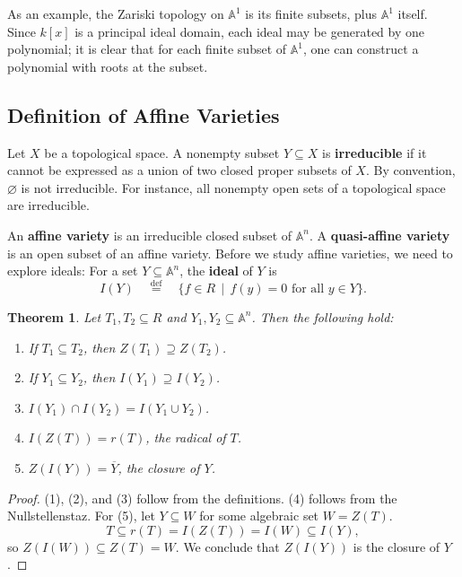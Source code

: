 \documentclass[11pt]{article}
\newtheorem{theorem}{Theorem}
\begin{document}
As an example, the Zariski topology on $\mathbb{A}^{1}$ is its finite subsets, plus $\mathbb{A}^{1}$ itself. Since $k[x]$ is a principal ideal domain, each ideal may be generated by one polynomial; it is clear that for each finite subset of $\mathbb{A}^{1}$, one can construct a polynomial with roots at the subset.


\subsection{Definition of Affine Varieties}

Let $X$ be a topological space. A nonempty subset $Y \subseteq X$ is \textbf{irreducible} if it cannot be expressed as a union of two closed proper subsets of $X$. By convention, $\varnothing$ is not irreducible. For instance, all nonempty open sets of a topological space are irreducible.
 
An \textbf{affine variety} is an irreducible closed subset of $\mathbb{A}^{n}$. A \textbf{quasi-affine variety} is an open subset of an affine variety. Before we study affine varieties, we need to explore ideals: For a set $Y \subseteq \mathbb{A}^{n}$, the \textbf{ideal} of $Y$ is
\[
  I(Y) \quad \stackrel{\text{def}}{=} \quad \{ f \in R \, \mid \, f(y) = 0 \text{ for all } y \in Y \}.
\]
\begin{adjustwidth}{0.5cm}{}
  \begin{theorem}
    Let $T_{1}, T_{2} \subseteq R$ and $Y_{1}, Y_{2} \subseteq \mathbb{A}^{n}$. Then the following hold:
    \begin{enumerate}
      \item If $T_{1} \subseteq T_{2}$, then $Z(T_{1}) \supseteq Z(T_{2})$.
      \item If $Y_{1} \subseteq Y_{2}$, then $I(Y_{1}) \supseteq I(Y_{2})$.
      \item $I(Y_{1}) \cap I(Y_{2}) = I(Y_{1} \cup Y_{2})$.
      \item $I(Z(T)) = r(T)$, the radical of $T$.
      \item $Z(I(Y)) = \overline{Y}$, the closure of $Y$.
    \end{enumerate}
  \end{theorem}
  \begin{proof}
    (1), (2), and (3) follow from the definitions. (4) follows from the Nullstellenstaz. For (5), let $Y \subseteq W$ for some algebraic set $W = Z(T)$. 
    \[
      T \subseteq r(T) = I(Z(T)) = I(W) \subseteq I(Y),
    \]
    so $Z(I(W)) \subseteq Z(T) = W$. We conclude that $Z(I(Y))$ is the closure of $Y$.
  \end{proof}
\end{adjustwidth}
\end{document}
